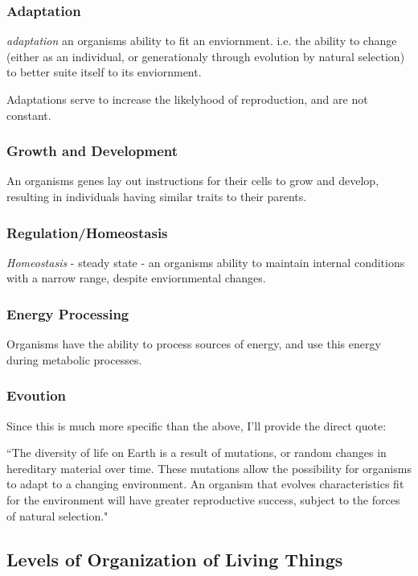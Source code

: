 \documentclass{article}
\theoremstyle{definition}
\begin{document}
\subsubsection{Adaptation}

 \textit{adaptation}
an organisms ability to fit an enviornment. i.e. the ability to change (either as an individual, or generationaly through evolution by natural selection) to better suite itself to its enviornment.

Adaptations serve to increase the likelyhood of reproduction, and are not constant.

\subsubsection{Growth and Development}

An organisms genes lay out instructions for their cells to grow and develop, resulting in individuals having similar traits to their parents.

\subsubsection{Regulation/Homeostasis}

 \textit{Homeostasis} - steady state -
an organisms ability to maintain internal conditions with a narrow range, despite  enviornmental changes.

\subsubsection{Energy Processing}

Organisms have the ability to process sources of energy, and use this energy during metabolic processes.

\subsubsection{Evoution}
Since this is much more specific than the above, I'll provide the direct quote:

``The diversity of life on Earth is a result of mutations, or random changes in hereditary material over time. These mutations allow
the possibility for organisms to adapt to a changing environment. An organism that evolves characteristics fit for the
environment will have greater reproductive success, subject to the forces of natural selection."

\subsection{Levels of Organization of Living  Things}
\end{document}
